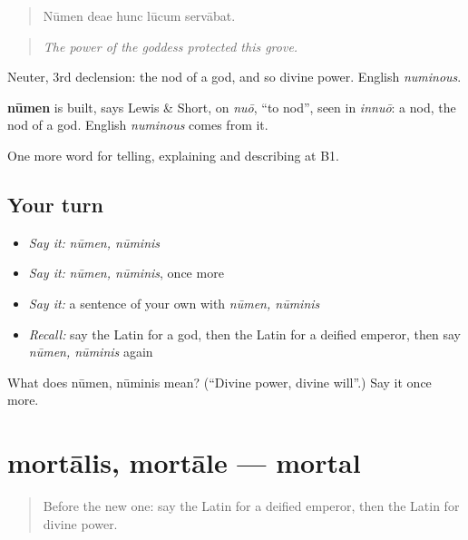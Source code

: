 \begin{quote}
Nūmen deae hunc lūcum servābat.
\end{quote}

\begin{quote}
\emph{The power of the goddess protected this grove.}
\end{quote}

Neuter, 3rd declension: the nod of a god, and so divine power. English \emph{numinous}.

\begin{cousinweb}
\textbf{nūmen} is built, says Lewis \& Short, on \emph{nuō}, \textquotedblleft{}to nod\textquotedblright{}, seen in \emph{innuō}: a nod, the nod of a god. English \emph{numinous} comes from it.
\end{cousinweb}

\begin{grammarlens}[title={What you've built}]
One more word for telling, explaining and describing at B1.
\end{grammarlens}

\subsection*{Your turn}
\begin{itemize}
\raggedright
  \item \emph{Say it:} \emph{nūmen, nūminis}
  \item \emph{Say it:} \emph{nūmen, nūminis}, once more
  \item \emph{Say it:} a sentence of your own with \emph{nūmen, nūminis}
  \item \emph{Recall:} say the Latin for a god, then the Latin for a deified emperor, then say \emph{nūmen, nūminis} again
\end{itemize}

\begin{tcolorbox}[breakable,colback=teal!4,colframe=teal!35!black,title={Before you move on}]
What does nūmen, nūminis mean? (\textquotedblleft{}Divine power, divine will\textquotedblright{}.) Say it once more.
\end{tcolorbox}
\section[mortālis, mortāle]{mortālis, mortāle — mortal}

\label{lesson:LA-C346-mortalis}



\begin{quote}
Before the new one: say the Latin for a deified emperor, then the Latin for divine power.
\end{quote}

